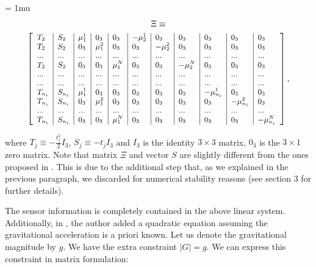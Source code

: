 \documentclass[letterpaper, 10 pt, journal, final]{ieeeconf}  %
\begin{document}
{
\arraycolsep=3pt %
\medmuskip = 1mu %
\begin{multline*}
  \Xi \equiv \\
      {
        \footnotesize
        \left[
          \begin{array}{l|l|l|l|l|l|l|l|l|l|l}
            T_2 & S_2 & \mu_1^1 & 0_3 & 0_3 & -\mu_2^1 & 0_3 & 0_3 & 0_3 & 0_3 & 0_3 \\
            T_2 & S_2 & 0_3 & \mu_1^2 & 0_3 & 0_3 & -\mu_2^2 & 0_3 & 0_3 & 0_3 & 0_3 \\
            ... & ... & ... & ... & ... & ... & ... & ... & ... & ... & ... \\
            T_2 & S_2 & 0_3 & 0_3 & \mu_1^N & 0_3 & 0_3 & -\mu_2^N & 0_3 & 0_3 & 0_3 \\
            ... & ... & ... & ... & ... & ... & ... & ... & ... & ... & ... \\
            ... & ... & ... & ... & ... & ... & ... & ... & ... & ... & ... \\
            T_{n_i} & S_{n_i} & \mu_1^1 & 0_3 & 0_3 & 0_3 & 0_3 & 0_3 & -\mu_{n_i}^1 & 0_3 & 0_3 \\
            T_{n_i} & S_{n_i} & 0_3 & \mu_1^2 & 0_3 & 0_3 & 0_3 & 0_3 & 0_3 & -\mu_{n_i}^2 & 0_3 \\
            ... & ... & ... & ... & ... & ... & ... & ... & ... & ... & ... \\
            T_{n_i} & S_{n_i} & 0_3 & 0_3 & \mu_1^N & 0_3 & 0_3 & 0_3 & 0_3 & 0_3 & -\mu_{n_i}^N
          \end{array}
          \right],
      }
\end{multline*}
}

\noindent where $T_j \equiv - \frac{t^2_j}{2} I_3$, $S_j \equiv -t_j I_3$ and $I_3$ is the identity $3\times 3$ matrix, $0_3$ is the $3\times 1$ zero matrix.
Note that matrix $\Xi$ and vector $S$ are slightly different from the ones proposed in \cite{Martinelli2014}.
This is due to the additional step that, as we explained in the previous paragraph, we discarded for numerical stability reasons (see \cite{Martinelli2014} section 3 for further details).

The sensor information is completely contained in the above linear system. Additionally, in \cite{Martinelli2014}, the author added a quadratic equation assuming the gravitational acceleration is a priori known.
Let us denote the gravitational magnitude by $g$.
We have the extra constraint $|G| = g$. We can express this constraint in matrix formulation:
\end{document}
